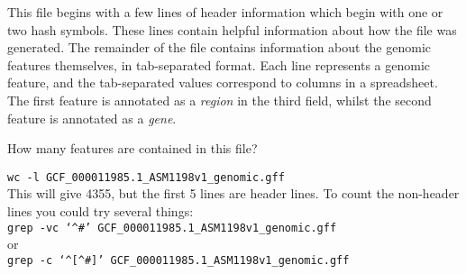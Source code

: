 This file begins with a few lines of header information which begin with one or two hash symbols.
These lines contain helpful information about how the file was generated.
The remainder of the file contains information about the genomic features themselves, in tab-separated format.
Each line represents a genomic feature, and the tab-separated values correspond to columns in a spreadsheet.
The first feature is annotated as a \textit{region} in the third field, whilst the second feature is annotated as a \textit{gene}.

\begin{questions}
How many features are contained in this file?\\
\begin{answer}
\texttt{wc -l GCF\_000011985.1\_ASM1198v1\_genomic.gff} \\
This will give 4355, but the first 5 lines are header lines.
To count the non-header lines you could try several things:\\
\texttt{grep -vc `\^{}\#' GCF\_000011985.1\_ASM1198v1\_genomic.gff} \\
or\\
\texttt{grep -c `\^{}[\^{}\#]' GCF\_000011985.1\_ASM1198v1\_genomic.gff} \\
\end{answer}

\end{questions}

